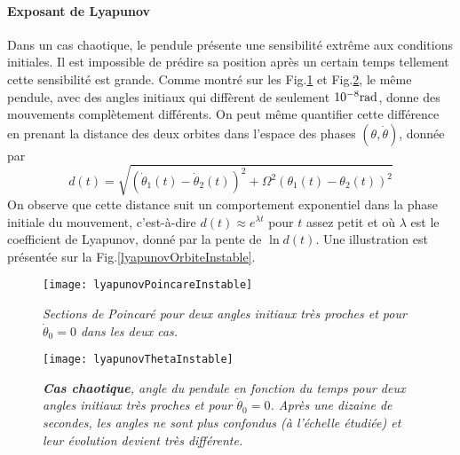 \documentclass[a4paper,12pt,oneside]{article}
\def \t {\theta}
\def \vt {\Dot{\theta}}
\begin{document}
\paragraph{Exposant de Lyapunov}
Dans un cas chaotique, le pendule présente une sensibilité extrême aux conditions initiales. Il est impossible de prédire sa position après un certain temps tellement cette sensibilité est grande. Comme montré sur les Fig.\ref{lyapunovPoincareInstable} et Fig.\ref{lyapunovThetaInstable}, le même pendule, avec des angles initiaux qui diffèrent de seulement $10^{-8} \rm{rad}$, donne des mouvements complètement différents. On peut même quantifier cette différence en prenant la distance des deux orbites dans l'espace des phases $(\t,\vt)$, donnée par
\[
d(t)=\sqrt{(\vt_1(t)-\vt_2(t))^2+\Omega^2(\t_1(t)-\t_2(t))^2}
\]
On observe que cette distance suit un comportement exponentiel dans la phase initiale du mouvement, c'est-à-dire $d(t) \approx e^{\lambda t}$ pour $t$ assez petit et où $\lambda$ est le coefficient de Lyapunov, donné par la pente de $\ln{d(t)}$. Une illustration est présentée sur la Fig.\ref{lyapunovOrbiteInstable}.
\begin{figure}[H]
    \centerline{\texttt{[image: lyapunovPoincareInstable]}}
\caption{ \label{lyapunovPoincareInstable}\em
Sections de Poincaré pour deux angles initiaux très proches et pour $\vt_0=0$ dans les deux cas.
}
\end{figure}

\begin{figure}[H]
    \centerline{\texttt{[image: lyapunovThetaInstable]}}
\caption{ \label{lyapunovThetaInstable}\em
\textbf{Cas chaotique}, angle du pendule en fonction du temps pour deux angles initiaux très proches et pour $\vt_0=0$. Après une dizaine de secondes, les angles ne sont plus confondus (à l'échelle étudiée) et leur évolution devient très différente.
}
\end{figure}
\end{document}
